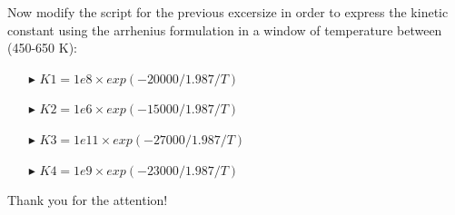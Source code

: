 \documentclass[xcolor={dvipsnames,rgb}, aspectratio=169]{beamer}
\begin{document}
\begin{frame}{}
   Now modify the script for the previous excersize in order to express the kinetic
   constant using the arrhenius formulation in a window of temperature between (450-650
   K):
   \begin{itemize}
      \item[$\blacktriangleright$] $K1 = 1e8 \times exp(-20000/1.987/T)$
      \item[$\blacktriangleright$] $K2 = 1e6 \times exp(-15000/1.987/T)$
      \item[$\blacktriangleright$] $K3 = 1e11 \times exp(-27000/1.987/T)$
      \item[$\blacktriangleright$] $K4 = 1e9 \times exp(-23000/1.987/T)$
   \end{itemize}
\end{frame}

{%
\begin{frame}[standout]
	Thank you for the attention!
\end{frame}
}
\end{document}

